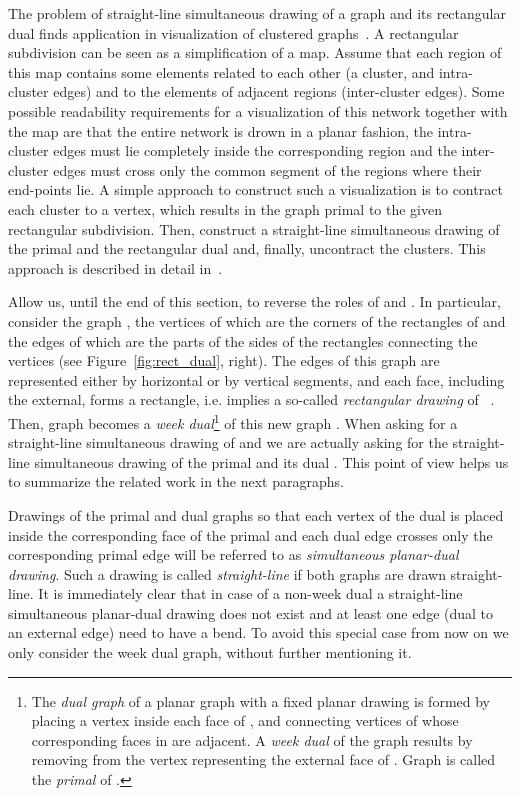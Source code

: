 \documentclass{llncs}
\begin{document}
The problem of straight-line simultaneous drawing of a graph and its rectangular dual finds application in visualization of clustered graphs~\cite{AlamKKM14,HuGK10}. A rectangular subdivision can be seen as a simplification of a map. Assume that each region of this map contains some elements related to each other (a cluster, and intra-cluster edges) and to  the elements of adjacent regions (inter-cluster edges). Some possible readability requirements for a visualization of this network together with the map are that the entire network is drown in a planar fashion, the intra-cluster edges must lie completely inside the corresponding region and the inter-cluster edges must cross only the common segment of the regions where their end-points lie.   A simple approach to construct such a visualization is to contract each cluster to a vertex, which results in the graph primal to the given rectangular subdivision. Then, construct a straight-line simultaneous drawing of the primal and the rectangular dual and, finally, uncontract the clusters. This approach is described in detail in~\cite[Theorem~2]{AlamKKM14}.   

Allow us, until the end of this section, to reverse the roles of  and . In particular, consider the graph , the vertices of which are the corners of the rectangles of  and the edges of which are the parts of the sides of the rectangles connecting the vertices (see Figure~\ref{fig:rect_dual}, right). The edges of this graph are represented either by horizontal or by vertical segments, and each face, including the external, forms a rectangle, i.e.  implies  a so-called \emph{rectangular drawing} of ~\cite{gdhandbook13rect}.  Then, graph  becomes a \emph{week dual}\footnote{The  \emph{dual graph}  of a planar graph  with a fixed planar drawing is formed by placing a vertex inside each face of , and connecting  vertices of  whose corresponding faces in  are adjacent. A \emph{week dual} of the graph  results 
by removing from  the vertex representing the external face of .
Graph  is  called the \emph{primal} of .
} of this new graph . 
When asking for a straight-line simultaneous drawing of  and  we are actually asking for the  straight-line simultaneous drawing of the primal  and its dual . This point of view helps us to summarize the related work in the next paragraphs. 

Drawings of the primal and dual graphs so that each vertex of the dual is placed inside the corresponding face of the primal and each dual edge crosses only the corresponding primal edge will be referred to as  \emph{simultaneous planar-dual drawing}. Such a drawing is called \emph{straight-line} if both graphs are drawn straight-line.  It is immediately clear that in case of a non-week dual   a straight-line simultaneous planar-dual drawing does not exist and at least one edge (dual to an external edge)  need to have a bend. To avoid this special case from now on we only consider the week dual graph, without further mentioning  it. 
\end{document}
